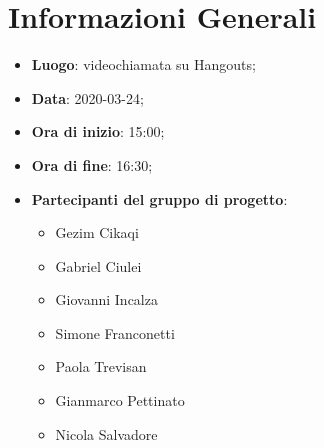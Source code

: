 \section{Informazioni Generali}
	\begin{itemize}
		\item \textbf {Luogo}: videochiamata su Hangouts;
		\item \textbf {Data}: 2020-03-24;
		\item \textbf {Ora di inizio}: 15:00;
		\item \textbf {Ora di fine}: 16:30;
		\item \textbf {Partecipanti del gruppo di progetto}:
			\begin{itemize}
				\item Gezim Cikaqi
				\item Gabriel Ciulei
				\item Giovanni Incalza
				\item Simone Franconetti
				\item Paola Trevisan
				\item Gianmarco Pettinato
				\item Nicola Salvadore
			\end{itemize}
	\end{itemize}